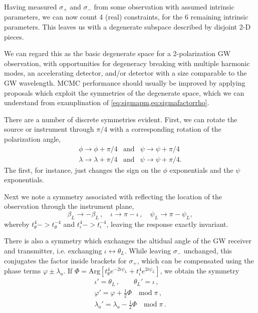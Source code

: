 \documentclass[aps,showpacs,12pt,onecolumn,prd,superscriptaddress,nofootinbib]{revtex4}
\newcommand{\be}{\begin{equation}}
\newcommand{\ee}{\end{equation}}
\newcommand{\nn}{\nonumber}
\newcommand\betaL{{\beta_{L}}}
\newcommand\psiL{{\psi_{L}}}
\begin{document}
Having measured $\sigma_{+}$ and $\sigma_{-}$ from some observation with assumed intrinsic parameters, we can now count 4 (real) constraints, for the 6 remaining intrinsic parameters.  This leaves us with a degenerate subspace described by disjoint 2-D pieces.

We can regard this as the basic degenerate space for a 2-polarization GW observation, with opportunities for degeneracy breaking with multiple harmonic modes, an accelerating detector, and/or detector with a size comparable to the GW wavelength.  MCMC performance should usually be improved by applying proposals which exploit the symmetries of the degenerate space, which we can understand from examplination of \eqref{eq:sigmapm,eq:sigmafactorrho}.

There are a number of discrete symmetries evident. First, we can rotate the source or instrument through $\pi/4$ with a corresponding rotation of the polarization angle,
\begin{align}
  \phi\rightarrow\phi+\pi/4&\mathrm{and}&\psi\rightarrow\psi+\pi/4\\
  \lambda\rightarrow\lambda+\pi/4&\mathrm{and}&\psi\rightarrow\psi+\pi/4.
\end{align}
The first, for instance, just changes the sign on the $\phi$ exponentials and the $\psi$ exponentials. 

Next we note a symmetry associated with reflecting the location of the observation through the instrument plane, 
\be\label{eq:symmetryresponse}
\betaL \rightarrow -\betaL\,, \quad \iota \rightarrow \pi - \iota \,, \quad \psiL \rightarrow \pi - \psiL,
\ee
whereby  $t^4_{\theta}->t^{-4}_{\theta}$ and $t^4_{\iota}->t^{-4}_{\iota}$,
leaving the response exactly invariant.

There is also a symmetry which exchanges the altidual angle of the GW receiver and transmitter, i.e. exchanging $\iota \leftrightarrow \theta_{L}$. While leaving $\sigma_-$ unchanged, this conjugates the factor inside brackets for $\sigma_{+}$, which can be compensated using the phase terms $\varphi \pm \lambda_{a}$. If $\Phi = \mathrm{Arg} \left[ t_{\theta}^{4} e^{-2 i \psiL} + t_{\iota}^{4} e^{2 i \psiL} \right]$, we obtain the symmetry
\begin{align}
	\iota' = \theta_{L} \,, \qquad \theta_{L}' = \iota \,, \nn\\
	\varphi' = \varphi + \frac{1}{2} \Phi \quad \mathrm{mod} \; \pi\,, \nn\\
	\lambda_{a}' = \lambda_{a} - \frac{1}{2} \Phi \quad \mathrm{mod} \; \pi\,.
\end{align}
\end{document}
